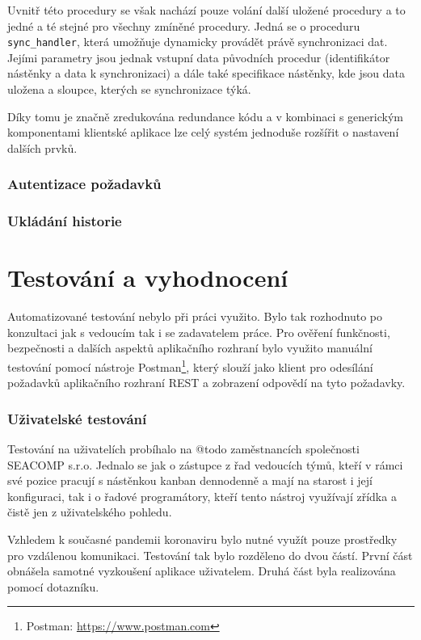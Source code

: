 Uvnitř této procedury se však nachází pouze volání další uložené procedury a to jedné a té stejné pro všechny zmíněné procedury. Jedná se o proceduru \texttt{sync\_handler}, která umožňuje dynamicky provádět právě synchronizaci dat. Jejími parametry jsou jednak vstupní data původních procedur (identifikátor nástěnky a data k synchronizaci) a dále také specifikace nástěnky, kde jsou data uložena a sloupce, kterých se synchronizace týká.

Díky tomu je značně zredukována redundance kódu a v kombinaci s generickým komponentami klientské aplikace lze celý systém jednoduše rozšířit o nastavení dalších prvků.


\subsection{Autentizace požadavků}
\blindtext


\subsection{Ukládání historie}
\blindtext


\chapter{Testování a vyhodnocení}
\blindtext

Automatizované testování nebylo při práci využito. Bylo tak rozhodnuto po konzultaci jak s vedoucím tak i se zadavatelem práce. Pro ověření funkčnosti, bezpečnosti a dalších aspektů aplikačního rozhraní bylo využito manuální testování pomocí nástroje Postman\footnote{Postman: \url{https://www.postman.com}}, který slouží jako klient pro odesílání požadavků aplikačního rozhraní REST a zobrazení odpovědí na tyto požadavky.

\subsection{Uživatelské testování}
Testování na uživatelích probíhalo na @todo zaměstnancích společnosti SEACOMP s.r.o. Jednalo se jak o zástupce z řad vedoucích týmů, kteří v rámci své pozice pracují s nástěnkou kanban dennodenně a mají na starost i její konfiguraci, tak i o řadové programátory, kteří tento nástroj využívají zřídka a čistě jen z uživatelského pohledu.

Vzhledem k současné pandemii koronaviru bylo nutné využít pouze prostředky pro vzdálenou komunikaci. Testování tak bylo rozděleno do dvou částí. První část obnášela samotné vyzkoušení aplikace uživatelem. Druhá část byla realizována pomocí dotazníku.

